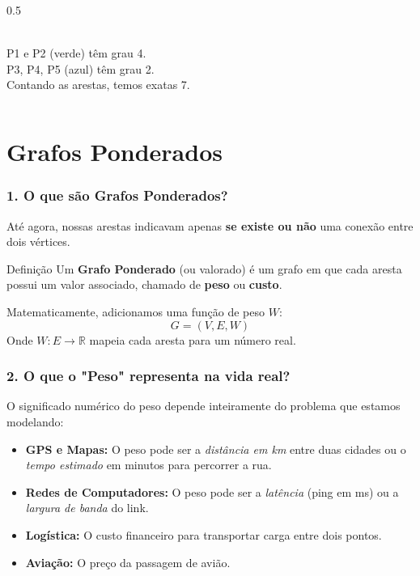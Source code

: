 \documentclass[9pt]{beamer}
\begin{document}
\begin{frame}
\begin{columns}
\begin{column}{0.5\textwidth}
\begin{center}
                \vspace{0.2cm}\\
                \scriptsize P1 e P2 (verde) têm grau 4.\\
                \scriptsize P3, P4, P5 (azul) têm grau 2.\\
                \scriptsize Contando as arestas, temos exatas 7.
            \end{center}
        \end{column}
    \end{columns}
\end{frame}

\section{Grafos Ponderados}

\begin{frame}
    \frametitle{1. O que são Grafos Ponderados?}
    Até agora, nossas arestas indicavam apenas \textbf{se existe ou não} uma conexão entre dois vértices.
    \vspace{0.3cm}
    \begin{block}{Definição}
        Um \textbf{Grafo Ponderado} (ou valorado) é um grafo em que cada aresta possui um valor associado, chamado de \textbf{peso} ou \textbf{custo}.
    \end{block}
    \vspace{0.3cm}
    Matematicamente, adicionamos uma função de peso $W$:
    \[ G = (V, E, W) \]
    Onde $W: E \to \mathbb{R}$ mapeia cada aresta para um número real.
\end{frame}

\begin{frame}
    \frametitle{2. O que o "Peso" representa na vida real?}
    O significado numérico do peso depende inteiramente do problema que estamos modelando:
    \vspace{0.5cm}
    \begin{itemize}
        \item \textbf{GPS e Mapas:} O peso pode ser a \textit{distância em km} entre duas cidades ou o \textit{tempo estimado} em minutos para percorrer a rua.
        \item \textbf{Redes de Computadores:} O peso pode ser a \textit{latência} (ping em ms) ou a \textit{largura de banda} do link.
        \item \textbf{Logística:} O custo financeiro para transportar carga entre dois pontos.
        \item \textbf{Aviação:} O preço da passagem de avião.
    \end{itemize}
\end{frame}
\end{document}

